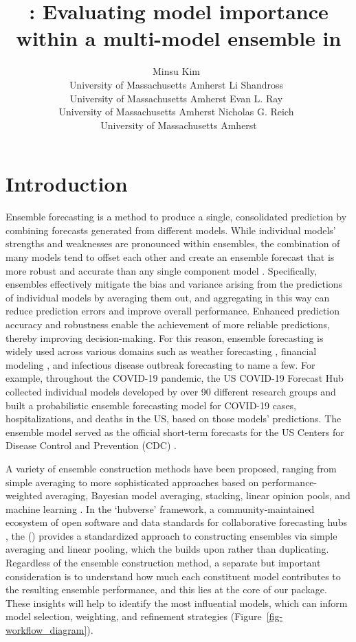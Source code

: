 \documentclass[
  article,
  shortnames,
  notitle]{jss}
\author{Minsu Kim~\orcidlink{0009-0008-4637-3589}\\University of
Massachusetts Amherst \And Li
Shandross~\orcidlink{0009-0008-1348-1954}\\University of Massachusetts
Amherst \AND Evan L. Ray~\orcidlink{0000-0003-4035-0243}\\University of
Massachusetts Amherst \And Nicholas G.
Reich~\orcidlink{0000-0003-3503-9899}\\University of Massachusetts
Amherst}
\title{\pkg{modelimportance}: Evaluating model importance within a
multi-model ensemble in \proglang{R}}
\begin{document}
\maketitle


\section{Introduction}\label{sec:intro}

Ensemble forecasting is a method to produce a single, consolidated
prediction by combining forecasts generated from different models. While
individual models' strengths and weaknesses are pronounced within
ensembles, the combination of many models tend to offset each other and
create an ensemble forecast that is more robust and accurate than any
single component model
\citep{gneiting2005weather, hastie01statisticallearning}. Specifically,
ensembles effectively mitigate the bias and variance arising from the
predictions of individual models by averaging them out, and aggregating
in this way can reduce prediction errors and improve overall
performance. Enhanced prediction accuracy and robustness enable the
achievement of more reliable predictions, thereby improving
decision-making. For this reason, ensemble forecasting is widely used
across various domains such as weather forecasting
\citep{Guerra_2020, gneiting2005weather}, financial modeling
\citep{SUN2020101160, math11041054}, and infectious disease outbreak
forecasting
\citep{ray_prediction_2018, reich_accuracy_2019, lutz_applying_2019, viboud_rapidd_2018}
to name a few. For example, throughout the COVID-19 pandemic, the US
COVID-19 Forecast Hub collected individual models developed by over 90
different research groups and built a probabilistic ensemble forecasting
model for COVID-19 cases, hospitalizations, and deaths in the US, based
on those models' predictions. The ensemble model served as the official
short-term forecasts for the US Centers for Disease Control and
Prevention (CDC) \citep{cramer2022united}.

A variety of ensemble construction methods have been proposed, ranging
from simple averaging to more sophisticated approaches based on
performance-weighted averaging, Bayesian model averaging, stacking,
linear opinion pools, and machine learning
\citep{wang2023forecast, reich_accuracy_2019, ranjan2010combining}. In
the `hubverse' framework, a community-maintained ecosystem of open
software and data standards for collaborative forecasting hubs
\citep{hubverse_docs, kerr2025coordinating}, the 
(\citet{Rpackage-hubEnsembles}) provides a standardized approach to
constructing ensembles via simple averaging and linear pooling, which
the  builds upon rather than duplicating.
Regardless of the ensemble construction method, a separate but important
consideration is to understand how much each constituent model
contributes to the resulting ensemble performance, and this lies at the
core of our package. These insights will help to identify the most
influential models, which can inform model selection, weighting, and
refinement strategies (Figure~\ref{fig-workflow_diagram}).
\end{document}
